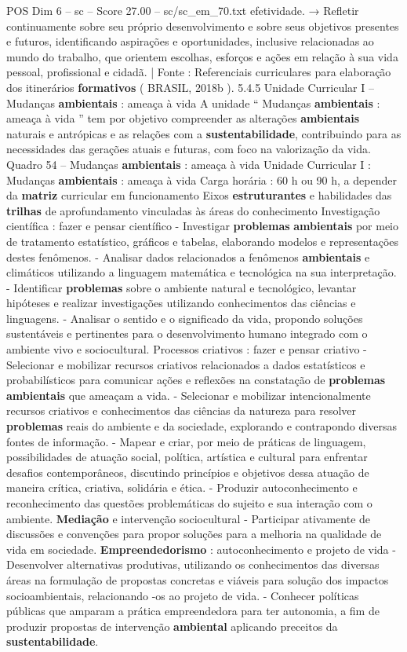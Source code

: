 \begin{textsample}{POS Dim 6 – sc – Score 27.00 – sc/sc\_em\_70.txt}
efetividade. → Refletir continuamente sobre seu próprio desenvolvimento e sobre seus objetivos presentes e futuros, identificando aspirações e oportunidades, inclusive relacionadas ao mundo do trabalho, que orientem escolhas, esforços e ações em relação à sua vida pessoal, profissional e cidadã. | Fonte : Referenciais curriculares para elaboração dos itinerários \textbf{formativos} ( BRASIL, 2018b ). 5.4.5 Unidade Curricular I – Mudanças \textbf{ambientais} : ameaça à vida A unidade “ Mudanças \textbf{ambientais} : ameaça à vida ” tem por objetivo compreender as alterações \textbf{ambientais} naturais e antrópicas e as relações com a \textbf{sustentabilidade}, contribuindo para as necessidades das gerações atuais e futuras, com foco na valorização da vida.
Quadro 54 – Mudanças \textbf{ambientais} : ameaça à vida Unidade Curricular I : Mudanças \textbf{ambientais} : ameaça à vida Carga horária : 60 h ou 90 h, a depender da \textbf{matriz} curricular em funcionamento Eixos \textbf{estruturantes} e habilidades das \textbf{trilhas} de aprofundamento vinculadas às áreas do conhecimento Investigação científica : fazer e pensar científico - Investigar \textbf{problemas} \textbf{ambientais} por meio de tratamento estatístico, gráficos e tabelas, elaborando modelos e representações destes fenômenos. - Analisar dados relacionados a fenômenos \textbf{ambientais} e climáticos utilizando a linguagem matemática e tecnológica na sua interpretação. - Identificar \textbf{problemas} sobre o ambiente natural e tecnológico, levantar hipóteses e realizar investigações utilizando conhecimentos das ciências e linguagens. - Analisar o sentido e o significado da vida, propondo soluções sustentáveis e pertinentes para o desenvolvimento humano integrado com o ambiente vivo e sociocultural.
Processos criativos : fazer e pensar criativo - Selecionar e mobilizar recursos criativos relacionados a dados estatísticos e probabilísticos para comunicar ações e reflexões na constatação de \textbf{problemas} \textbf{ambientais} que ameaçam a vida. - Selecionar e mobilizar intencionalmente recursos criativos e conhecimentos das ciências da natureza para resolver \textbf{problemas} reais do ambiente e da sociedade, explorando e contrapondo diversas fontes de informação. - Mapear e criar, por meio de práticas de linguagem, possibilidades de atuação social, política, artística e cultural para enfrentar desafios contemporâneos, discutindo princípios e objetivos dessa atuação de maneira crítica, criativa, solidária e ética. - Produzir autoconhecimento e reconhecimento das questões problemáticas do sujeito e sua interação com o ambiente. \textbf{Mediação} e intervenção sociocultural - Participar ativamente de discussões e convenções para propor soluções para a melhoria na qualidade de vida em sociedade. \textbf{Empreendedorismo} : autoconhecimento e projeto de vida - Desenvolver alternativas produtivas, utilizando os conhecimentos das diversas áreas na formulação de propostas concretas e viáveis para solução dos impactos socioambientais, relacionando -os ao projeto de vida. - Conhecer políticas públicas que amparam a prática empreendedora para ter autonomia, a fim de produzir propostas de intervenção \textbf{ambiental} aplicando preceitos da \textbf{sustentabilidade}.

\end{textsample}
